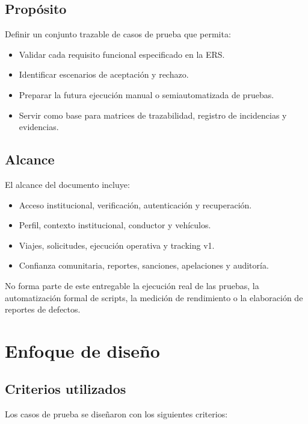 \documentclass[12pt]{article}
\begin{document}
\subsection{Prop\'osito}

Definir un conjunto trazable de casos de prueba que permita:

\begin{itemize}[leftmargin=1.2cm]
    \item Validar cada requisito funcional especificado en la ERS.
    \item Identificar escenarios de aceptaci\'on y rechazo.
    \item Preparar la futura ejecuci\'on manual o semiautomatizada de pruebas.
    \item Servir como base para matrices de trazabilidad, registro de incidencias y evidencias.
\end{itemize}

\subsection{Alcance}

El alcance del documento incluye:

\begin{itemize}[leftmargin=1.2cm]
    \item Acceso institucional, verificaci\'on, autenticaci\'on y recuperaci\'on.
    \item Perfil, contexto institucional, conductor y veh\'iculos.
    \item Viajes, solicitudes, ejecuci\'on operativa y tracking v1.
    \item Confianza comunitaria, reportes, sanciones, apelaciones y auditor\'ia.
\end{itemize}

No forma parte de este entregable la ejecuci\'on real de las pruebas, la automatizaci\'on formal de scripts, la medici\'on de rendimiento o la elaboraci\'on de reportes de defectos.

\section{Enfoque de dise\~no}

\subsection{Criterios utilizados}

Los casos de prueba se dise\~naron con los siguientes criterios:
\end{document}
